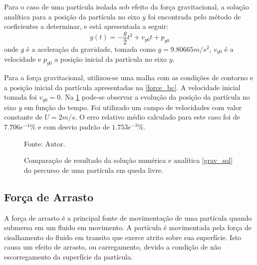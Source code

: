 Para o caso de uma partícula isolada sob efeito da força gravitacional, a solução analítica para a posição da partícula no eixo $y$ foi encontrada pelo método de coeficientes a determinar, e está apresentada a seguir:
\begin{equation}
    y(t) = -\dfrac{g}{2}t^2 + v_{y0}t + p_{y0}
    \label{grav_sol} 
\end{equation}
onde $g$ é a aceleração da gravidade, tomada como $g=9.80665m/s^2$, $v_{y0}$ é a velocidade e $p_{y0}$ a posição inicial da partícula no eixo $y$.

Para a força gravitacional, utilizou-se uma malha com as condições de contorno e a posição inicial da partícula apresentadas na \ref{force_bc}.
A velocidade inicial tomada foi $v_{y0}=0$.
Na \ref{grav_comp} pode-se observar a evolução da posição da partícula no eixo $y$ em função do tempo.
Foi utilizado um campo de velocidades com valor constante de $U=2m/s$.
O erro relativo médio calculado para este caso foi de $7.706e^{-4}\%$ e com desvio padrão de $1.753e^{-3}\%$.
\begin{figure}[H]
    \centering
     {\raggedleft \scriptsize Fonte: Autor.}
    \caption{Comparação de resultado da solução numérica e analítica \ref{grav_sol} do percurso de uma partícula em queda livre.}
    \label{grav_comp}
\end{figure}

\subsection{\textbf{Força de Arrasto}}
\label{sec_drag}
A força de arrasto é a principal fonte de movimentação de uma partícula quando submersa em um fluido em movimento.
A partícula é movimentada pela força de cisalhamento do fluido em transito que exerce atrito sobre sua superfície.
Isto causa um efeito de arrasto, ou carregamento, devido a condição de não escorregamento da superfície da partícula.

